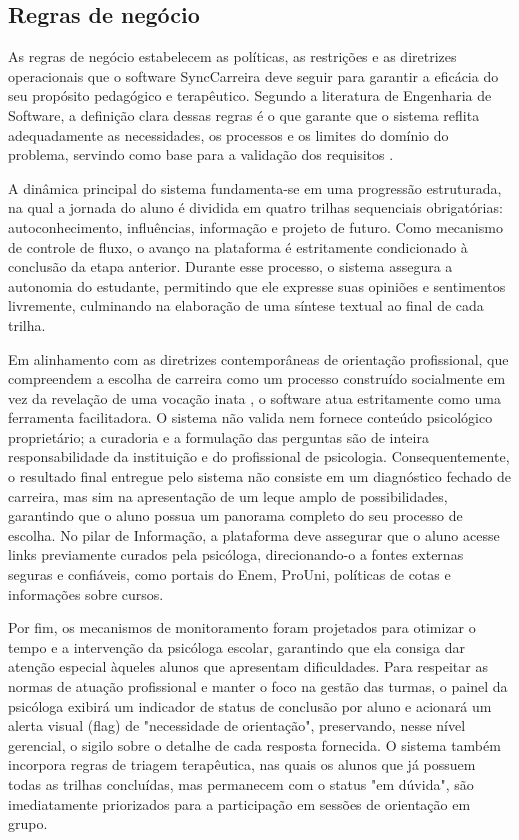 \subsection{Regras de negócio}

As regras de negócio estabelecem as políticas, as restrições e as diretrizes operacionais que o software SyncCarreira deve seguir para garantir a eficácia do seu propósito pedagógico e terapêutico. Segundo a literatura de Engenharia de Software, a definição clara dessas regras é o que garante que o sistema reflita adequadamente as necessidades, os processos e os limites do domínio do problema, servindo como base para a validação dos requisitos \cite{sommerville2011, pressman2016}.

A dinâmica principal do sistema fundamenta-se em uma progressão estruturada, na qual a jornada do aluno é dividida em quatro trilhas sequenciais obrigatórias: autoconhecimento, influências, informação e projeto de futuro. Como mecanismo de controle de fluxo, o avanço na plataforma é estritamente condicionado à conclusão da etapa anterior. Durante esse processo, o sistema assegura a autonomia do estudante, permitindo que ele expresse suas opiniões e sentimentos livremente, culminando na elaboração de uma síntese textual ao final de cada trilha.

Em alinhamento com as diretrizes contemporâneas de orientação profissional, que compreendem a escolha de carreira como um processo construído socialmente em vez da revelação de uma vocação inata \cite{bock2004}, o software atua estritamente como uma ferramenta facilitadora. O sistema não valida nem fornece conteúdo psicológico proprietário; a curadoria e a formulação das perguntas são de inteira responsabilidade da instituição e do profissional de psicologia. Consequentemente, o resultado final entregue pelo sistema não consiste em um diagnóstico fechado de carreira, mas sim na apresentação de um leque amplo de possibilidades, garantindo que o aluno possua um panorama completo do seu processo de escolha. No pilar de Informação, a plataforma deve assegurar que o aluno acesse links previamente curados pela psicóloga, direcionando-o a fontes externas seguras e confiáveis, como portais do Enem, ProUni, políticas de cotas e informações sobre cursos.

Por fim, os mecanismos de monitoramento foram projetados para otimizar o tempo e a intervenção da psicóloga escolar, garantindo que ela consiga dar atenção especial àqueles alunos que apresentam dificuldades. Para respeitar as normas de atuação profissional e manter o foco na gestão das turmas, o painel da psicóloga exibirá um indicador de status de conclusão por aluno e acionará um alerta visual (flag) de "necessidade de orientação", preservando, nesse nível gerencial, o sigilo sobre o detalhe de cada resposta fornecida. O sistema também incorpora regras de triagem terapêutica, nas quais os alunos que já possuem todas as trilhas concluídas, mas permanecem com o status "em dúvida", são imediatamente priorizados para a participação em sessões de orientação em grupo.

